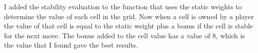 I added the stability evaluation to the function that uses the static weights to determine the value of each cell in the grid.
Now when a cell is owned by a player the value of that cell is equal to the static weight plus a bonus if the cell is stable for the next move.
The bonus added to the cell value has a value of 8, which is the value that I found gave the best results.
